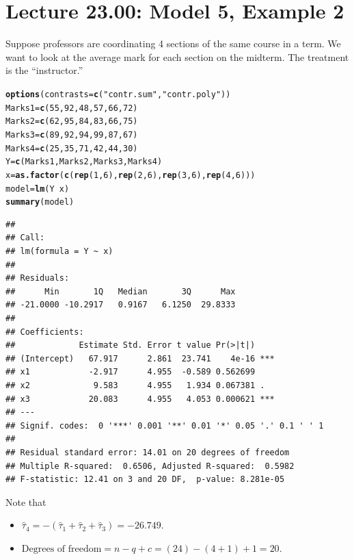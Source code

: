 \documentclass[oneside]{book}\usepackage[]{graphicx}\usepackage[dvipsnames,table,xcdraw]{xcolor}
\makeatletter
\newcommand{\hlnum}[1]{\textcolor[rgb]{0.686,0.059,0.569}{#1}}%
\newcommand{\hlstr}[1]{\textcolor[rgb]{0.192,0.494,0.8}{#1}}%
\newcommand{\hlopt}[1]{\textcolor[rgb]{0,0,0}{#1}}%
\newcommand{\hlstd}[1]{\textcolor[rgb]{0.345,0.345,0.345}{#1}}%
\newcommand{\hlkwb}[1]{\textcolor[rgb]{0.69,0.353,0.396}{#1}}%
\newcommand{\hlkwc}[1]{\textcolor[rgb]{0.333,0.667,0.333}{#1}}%
\newcommand{\hlkwd}[1]{\textcolor[rgb]{0.737,0.353,0.396}{\textbf{#1}}}%
\newenvironment{kframe}{%
 \def\at@end@of@kframe{}%
 \ifinner\ifhmode%
  \def\at@end@of@kframe{\end{minipage}}%
  \begin{minipage}{\columnwidth}%
 \fi\fi%
 \def\FrameCommand##1{\hskip\@totalleftmargin \hskip-\fboxsep
 \colorbox{shadecolor}{##1}\hskip-\fboxsep
     \hskip-\linewidth \hskip-\@totalleftmargin \hskip\columnwidth}%
 \MakeFramed {\advance\hsize-\width
   \@totalleftmargin\z@ \linewidth\hsize
   \@setminipage}}%
 {\par\unskip\endMakeFramed%
 \at@end@of@kframe}
\newenvironment{knitrout}{}{} %
\makeatother
\begin{document}
\section{Lecture 23.00: Model 5, Example 2}\label{section23}
Suppose professors are coordinating 4 sections
of the same course in a term. We want to look
at the average mark for each section on the midterm. The
treatment is the ``instructor.''
\begin{knitrout}
\color{fgcolor}\begin{kframe}
\begin{alltt}
\hlkwd{options}\hlstd{(}\hlkwc{contrasts} \hlstd{=} \hlkwd{c}\hlstd{(}\hlstr{"contr.sum"}\hlstd{,} \hlstr{"contr.poly"}\hlstd{))}
\hlstd{Marks1} \hlkwb{=} \hlkwd{c}\hlstd{(}\hlnum{55}\hlstd{,} \hlnum{92}\hlstd{,} \hlnum{48}\hlstd{,} \hlnum{57}\hlstd{,} \hlnum{66}\hlstd{,} \hlnum{72}\hlstd{)}
\hlstd{Marks2} \hlkwb{=} \hlkwd{c}\hlstd{(}\hlnum{62}\hlstd{,} \hlnum{95}\hlstd{,} \hlnum{84}\hlstd{,} \hlnum{83}\hlstd{,} \hlnum{66}\hlstd{,} \hlnum{75}\hlstd{)}
\hlstd{Marks3} \hlkwb{=} \hlkwd{c}\hlstd{(}\hlnum{89}\hlstd{,} \hlnum{92}\hlstd{,} \hlnum{94}\hlstd{,} \hlnum{99}\hlstd{,} \hlnum{87}\hlstd{,} \hlnum{67}\hlstd{)}
\hlstd{Marks4} \hlkwb{=} \hlkwd{c}\hlstd{(}\hlnum{25}\hlstd{,} \hlnum{35}\hlstd{,} \hlnum{71}\hlstd{,} \hlnum{42}\hlstd{,} \hlnum{44}\hlstd{,} \hlnum{30}\hlstd{)}
\hlstd{Y} \hlkwb{=} \hlkwd{c}\hlstd{(Marks1, Marks2, Marks3, Marks4)}
\hlstd{x} \hlkwb{=} \hlkwd{as.factor}\hlstd{(}\hlkwd{c}\hlstd{(}\hlkwd{rep}\hlstd{(}\hlnum{1}\hlstd{,} \hlnum{6}\hlstd{),} \hlkwd{rep}\hlstd{(}\hlnum{2}\hlstd{,} \hlnum{6}\hlstd{),} \hlkwd{rep}\hlstd{(}\hlnum{3}\hlstd{,} \hlnum{6}\hlstd{),} \hlkwd{rep}\hlstd{(}\hlnum{4}\hlstd{,} \hlnum{6}\hlstd{)))}
\hlstd{model} \hlkwb{=} \hlkwd{lm}\hlstd{(Y} \hlopt{~} \hlstd{x)}
\hlkwd{summary}\hlstd{(model)}
\end{alltt}
\begin{verbatim}
## 
## Call:
## lm(formula = Y ~ x)
## 
## Residuals:
##      Min       1Q   Median       3Q      Max 
## -21.0000 -10.2917   0.9167   6.1250  29.8333 
## 
## Coefficients:
##             Estimate Std. Error t value Pr(>|t|)    
## (Intercept)   67.917      2.861  23.741    4e-16 ***
## x1            -2.917      4.955  -0.589 0.562699    
## x2             9.583      4.955   1.934 0.067381 .  
## x3            20.083      4.955   4.053 0.000621 ***
## ---
## Signif. codes:  0 '***' 0.001 '**' 0.01 '*' 0.05 '.' 0.1 ' ' 1
## 
## Residual standard error: 14.01 on 20 degrees of freedom
## Multiple R-squared:  0.6506,	Adjusted R-squared:  0.5982 
## F-statistic: 12.41 on 3 and 20 DF,  p-value: 8.281e-05
\end{verbatim}
\end{kframe}
\end{knitrout}
Note that
\begin{itemize}
    \item $ \hat{\tau}_4=-(\hat{\tau}_1+\hat{\tau}_2+\hat{\tau}_3)=-26.749 $.
    \item $ \text{Degrees of freedom}=n-q+c=(24)-(4+1)+1=20 $.
\end{itemize}
\end{document}
